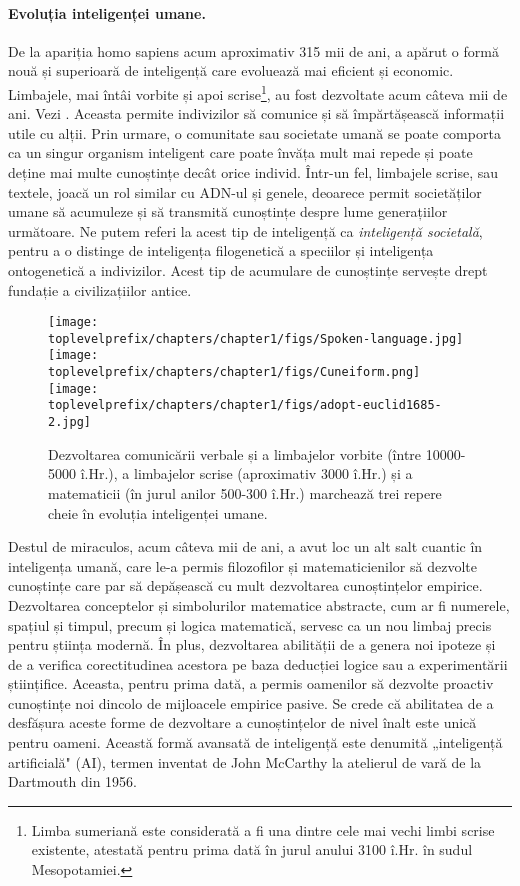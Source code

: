 \documentclass[../../book-main_ro.tex]{subfiles}
\begin{document}
\paragraph{Evoluția inteligenței umane.}
De la apariția homo sapiens acum aproximativ 315 mii de ani, a apărut o formă nouă și superioară de inteligență care evoluează mai eficient și economic. Limbajele, mai întâi vorbite și apoi scrise\footnote{Limba sumeriană este considerată a fi una dintre cele mai vechi limbi scrise existente, atestată pentru prima dată în jurul anului 3100 î.Hr. în sudul Mesopotamiei.}, au fost dezvoltate acum câteva mii de ani. Vezi . Aceasta permite indivizilor să comunice și să împărtășească informații utile cu alții. Prin urmare, o comunitate sau societate umană se poate comporta ca un singur organism inteligent care poate învăța mult mai repede și poate deține mai multe cunoștințe decât orice individ. Într-un fel, limbajele scrise, sau textele, joacă un rol similar cu ADN-ul și genele, deoarece permit societăților umane să acumuleze și să transmită cunoștințe despre lume generațiilor următoare. Ne putem referi la acest tip de inteligență ca {\em inteligență societală}, pentru a o distinge de inteligența filogenetică a speciilor și inteligența ontogenetică a indivizilor. Acest tip de acumulare de cunoștințe servește drept fundație a civilizațiilor antice.
\begin{figure}
    \centering
    \texttt{[image: \\toplevelprefix/chapters/chapter1/figs/Spoken-language.jpg]}
   \hspace{5mm} \texttt{[image: \\toplevelprefix/chapters/chapter1/figs/Cuneiform.png]}
   \hspace{5mm} \texttt{[image: \\toplevelprefix/chapters/chapter1/figs/adopt-euclid1685-2.jpg]}
    \caption{Dezvoltarea comunicării verbale și a limbajelor vorbite (între 10000-5000 î.Hr.), a limbajelor scrise (aproximativ 3000 î.Hr.) și a matematicii (în jurul anilor 500-300 î.Hr.) marchează trei repere cheie în evoluția inteligenței umane.}
    \label{fig:human-intelligence}
\end{figure}

Destul de miraculos, acum câteva mii de ani, a avut loc un alt salt cuantic în inteligența umană, care le-a permis filozofilor și matematicienilor să dezvolte cunoștințe care par să depășească cu mult dezvoltarea cunoștințelor empirice. Dezvoltarea conceptelor și simbolurilor matematice abstracte, cum ar fi numerele, spațiul și timpul, precum și logica matematică, servesc ca un nou limbaj precis pentru știința modernă. În plus, dezvoltarea abilității de a genera noi ipoteze și de a verifica corectitudinea acestora pe baza deducției logice sau a experimentării științifice. Aceasta, pentru prima dată, a permis oamenilor să dezvolte proactiv cunoștințe noi dincolo de mijloacele empirice pasive. Se crede că abilitatea de a desfășura aceste forme de dezvoltare a cunoștințelor de nivel înalt este unică pentru oameni. Această formă avansată de inteligență este denumită „inteligență artificială" (AI), termen inventat de John McCarthy la atelierul de vară de la Dartmouth din 1956.
\end{document}
